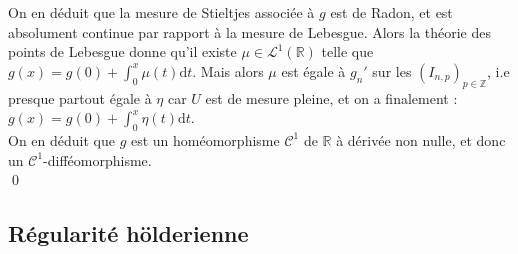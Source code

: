 \documentclass[11pt,a4paper]{article}
\begin{document}
On en déduit que la mesure de Stieltjes associée à $g$ est de Radon, et est absolument continue par rapport à la mesure de Lebesgue. Alors la théorie des points de Lebesgue donne qu'il existe $\mu \in \mathcal{L}^1(\mathbb{R})$ telle que $g(x) = g(0) + \displaystyle \int_0^x \mu(t) \mathrm{d}t$. Mais alors $\mu$ est égale à $g_n'$ sur les $(I_{n,p})_{p\in \mathbb{Z}}$, i.e presque partout égale à $\eta$ car $U$ est de mesure pleine, et on a finalement : $g(x) = g(0) + \displaystyle \int_0^x \eta(t) \mathrm{d}t$. \\
On en déduit que $g$ est un homéomorphisme $\mathcal{C}^1$ de $\mathbb{R}$ à dérivée non nulle, et donc un $\mathcal{C}^1$-difféomorphisme. \\ \qed

\subsection{Régularité hölderienne}


\newpage
\printbibliography[heading=bibintoc, title={Références}]
\end{document}
